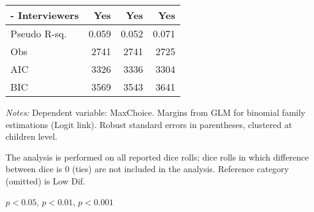 \begin{table}[htbp]
\begin{threeparttable}
\begin{tabular}{l*{3}{D{.}{.}{-1}}}
- Interviewers &                 Yes   &                 Yes   &                 Yes   \\
\midrule
Pseudo R-sq.        &                0.059  &                0.052  &                0.071   \\
Obs                 &                2741   &                2741   &                2725   \\
AIC                 &                3326   &                3336   &                3304   \\
BIC                 &                3569   &                3543   &                3641   \\
\bottomrule
\end{tabular}
\begin{tablenotes}
\footnotesize
\textit{Notes:} Dependent variable: MaxChoice. Margins from GLM for binomial family estimations (Logit link). Robust standard errors in parentheses, clustered at children level. \\
\item The analysis is performed on all reported dice rolls; dice rolls in which difference between dice is 0 (ties) are not included in the analysis. Reference category (omitted) is Low Dif. \\
\item \sym{*} \(p<0.05\), \sym{**} \(p<0.01\), \sym{***} \(p<0.001\)
\end{tablenotes}
\end{threeparttable}
\label{tab:cheat_patternsTOT}
\end{table}
